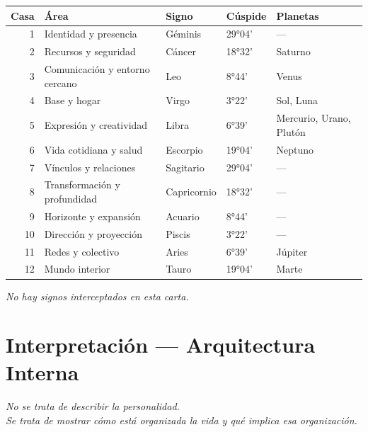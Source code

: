 \documentclass[11pt,a4paper]{article}
\begin{document}
\begin{center}
\begin{tabular}{rllll}
  \toprule
  \textbf{Casa} & \textbf{Área} & \textbf{Signo} & \textbf{Cúspide} & \textbf{Planetas} \\
  \midrule
  1 & Identidad y presencia & Géminis & 29°04' & — \\
  2 & Recursos y seguridad & Cáncer & 18°32' & Saturno \\
  3 & Comunicación y entorno cercano & Leo & 8°44' & Venus \\
  4 & Base y hogar & Virgo & 3°22' & Sol, Luna \\
  5 & Expresión y creatividad & Libra & 6°39' & Mercurio, Urano, Plutón \\
  6 & Vida cotidiana y salud & Escorpio & 19°04' & Neptuno \\
  7 & Vínculos y relaciones & Sagitario & 29°04' & — \\
  8 & Transformación y profundidad & Capricornio & 18°32' & — \\
  9 & Horizonte y expansión & Acuario & 8°44' & — \\
  10 & Dirección y proyección & Piscis & 3°22' & — \\
  11 & Redes y colectivo & Aries & 6°39' & Júpiter \\
  12 & Mundo interior & Tauro & 19°04' & Marte \\
  \bottomrule
\end{tabular}
\end{center}

\vspace{0.3cm}\textit{No hay signos interceptados en esta carta.}

\newpage

\section{Interpretación — Arquitectura Interna}

\begin{center}
{\small\itshape
No se trata de describir la personalidad.\\ Se trata de mostrar cómo está organizada la vida y qué implica esa organización.
}
\end{center}

\vspace{0.5cm}

\end{document}
